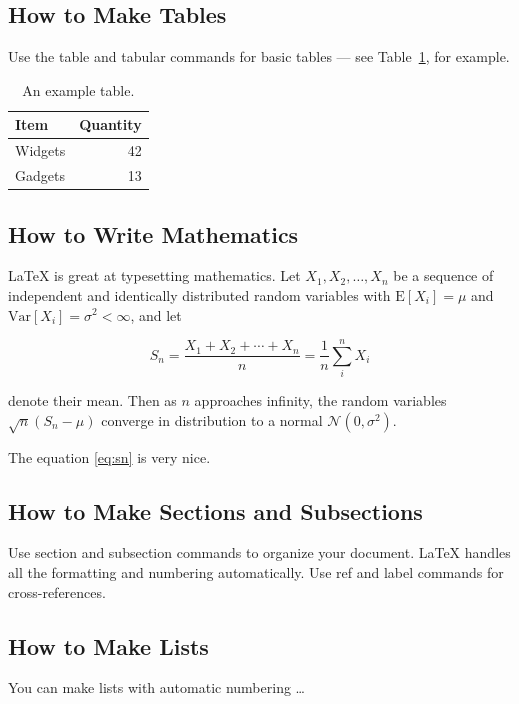 \documentclass[a4paper]{article}
\begin{document}
\subsection{How to Make Tables}

Use the table and tabular commands for basic tables --- see Table~\ref{tab:widgets}, for example.

\begin{table}
\centering
\begin{tabular}{l|r}
Item & Quantity \\\hline
Widgets & 42 \\
Gadgets & 13
\end{tabular}
\caption{\label{tab:widgets}An example table.}
\end{table}

\subsection{How to Write Mathematics}

\LaTeX{} is great at typesetting mathematics. Let $X_1, X_2, \ldots, X_n$ be a sequence of independent and identically distributed random variables with $\text{E}[X_i] = \mu$ and $\text{Var}[X_i] = \sigma^2 < \infty$, and let

\begin{equation}
S_n = \frac{X_1 + X_2 + \cdots + X_n}{n}
      = \frac{1}{n}\sum_{i}^{n} X_i
\label{eq:sn}
\end{equation}

denote their mean. Then as $n$ approaches infinity, the random variables $\sqrt{n}(S_n - \mu)$ converge in distribution to a normal $\mathcal{N}(0, \sigma^2)$.

The equation \ref{eq:sn} is very nice.

\subsection{How to Make Sections and Subsections}

Use section and subsection commands to organize your document. \LaTeX{} handles all the formatting and numbering automatically. Use ref and label commands for cross-references.

\subsection{How to Make Lists}

You can make lists with automatic numbering \dots
\end{document}
